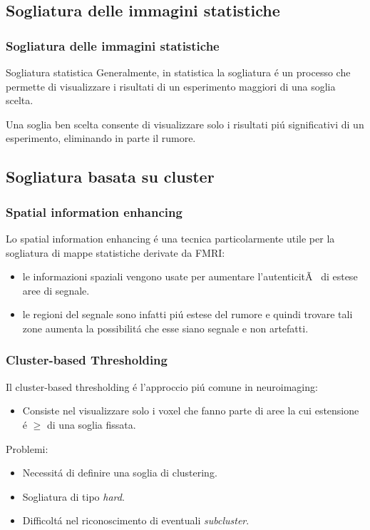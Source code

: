 \documentclass{beamer}
\begin{document}
\subsection{Sogliatura delle immagini statistiche}
\begin{frame}
\frametitle{Sogliatura delle immagini statistiche}
\begin{block}{Sogliatura statistica}
Generalmente, in statistica \alert{la sogliatura} \'e un processo che permette di visualizzare i risultati di un esperimento maggiori di una soglia scelta. 
\end{block}

\bigskip

Una soglia ben scelta consente di visualizzare solo i risultati pi\'u significativi di un esperimento, eliminando in parte il rumore.
\end{frame}

\subsection{Sogliatura basata su cluster}
\begin{frame}
\frametitle{Spatial information enhancing}
Lo spatial information enhancing \'e una tecnica particolarmente utile per la sogliatura di mappe statistiche derivate da FMRI:
\smallskip
\begin{itemize}

\item le informazioni spaziali vengono usate per aumentare l'autenticitÃ  di estese aree di segnale. 
\medskip
\item le regioni del segnale sono infatti pi\'u estese del rumore e quindi trovare tali zone aumenta la possibilit\'a che esse siano segnale e non artefatti.
\end{itemize}

\end{frame}

\begin{frame}
\frametitle{Cluster-based Thresholding}
Il cluster-based thresholding \'e l'approccio pi\'u comune in neuroimaging:
\smallskip
\begin{itemize}
\item Consiste nel visualizzare solo i voxel che fanno parte di aree la cui estensione \'e $\geq$ di una soglia fissata. 
\medskip
\end{itemize}
Problemi:
\begin{itemize}
\item Necessit\'a di definire una soglia di clustering.
\item Sogliatura di tipo \emph{hard}.
\item Difficolt\'a nel riconoscimento di eventuali \emph{subcluster}.
\end{itemize}
\end{frame}
\end{document}
